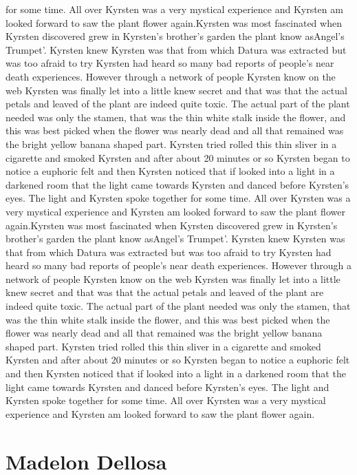 \documentclass[12pt]{book}
\begin{document}
for some time. All over Kyrsten was a very mystical experience and Kyrsten am looked forward to saw the plant flower again.Kyrsten was most fascinated when Kyrsten discovered grew in Kyrsten's brother's garden the plant know asAngel's Trumpet'. Kyrsten knew Kyrsten was that from which Datura was extracted but was too afraid to try Kyrsten had heard so many bad reports of people's near death experiences. However through a network of people Kyrsten know on the web Kyrsten was finally let into a little knew secret and that was that the actual petals and leaved of the plant are indeed quite toxic. The actual part of the plant needed was only the stamen, that was the thin white stalk inside the flower, and this was best picked when the flower was nearly dead and all that remained was the bright yellow banana shaped part. Kyrsten tried rolled this thin sliver in a cigarette and smoked Kyrsten and after about 20 minutes or so Kyrsten began to notice a euphoric felt and then Kyrsten noticed that if looked into a light in a darkened room that the light came towards Kyrsten and danced before Kyrsten's eyes. The light and Kyrsten spoke together for some time. All over Kyrsten was a very mystical experience and Kyrsten am looked forward to saw the plant flower again.Kyrsten was most fascinated when Kyrsten discovered grew in Kyrsten's brother's garden the plant know asAngel's Trumpet'. Kyrsten knew Kyrsten was that from which Datura was extracted but was too afraid to try Kyrsten had heard so many bad reports of people's near death experiences. However through a network of people Kyrsten know on the web Kyrsten was finally let into a little knew secret and that was that the actual petals and leaved of the plant are indeed quite toxic. The actual part of the plant needed was only the stamen, that was the thin white stalk inside the flower, and this was best picked when the flower was nearly dead and all that remained was the bright yellow banana shaped part. Kyrsten tried rolled this thin sliver in a cigarette and smoked Kyrsten and after about 20 minutes or so Kyrsten began to notice a euphoric felt and then Kyrsten noticed that if looked into a light in a darkened room that the light came towards Kyrsten and danced before Kyrsten's eyes. The light and Kyrsten spoke together for some time. All over Kyrsten was a very mystical experience and Kyrsten am looked forward to saw the plant flower again.



\chapter{Madelon Dellosa}
\end{document}
